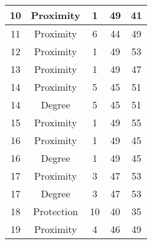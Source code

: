 \documentclass[results.tex]{subfiles}
\begin{document}
\begin{center}
\begin{tabular}{| c || c | c | c | c |}
            \hline
            10                      & Proximity                    & 1                      & 49                      & 41                   \\
            \hline
            11                      & Proximity                    & 6                      & 44                      & 49                   \\
            \hline
            12                      & Proximity                    & 1                      & 49                      & 53                   \\
            \hline
            13                      & Proximity                    & 1                      & 49                      & 47                   \\
            \hline
            14                      & Proximity                    & 5                      & 45                      & 51                   \\
            \hline
            14                      & Degree                       & 5                      & 45                      & 51                   \\
            \hline
            15                      & Proximity                    & 1                      & 49                      & 55                   \\
            \hline
            16                      & Proximity                    & 1                      & 49                      & 45                   \\
            \hline
            16                      & Degree                       & 1                      & 49                      & 45                   \\
            \hline
            17                      & Proximity                    & 3                      & 47                      & 53                   \\
            \hline
            17                      & Degree                       & 3                      & 47                      & 53                   \\
            \hline
            18                      & Protection                   & 10                     & 40                      & 35                   \\
            \hline
            19                      & Proximity                    & 4                      & 46                      & 49                   \\

\end{tabular}
\end{center}
\end{document}

